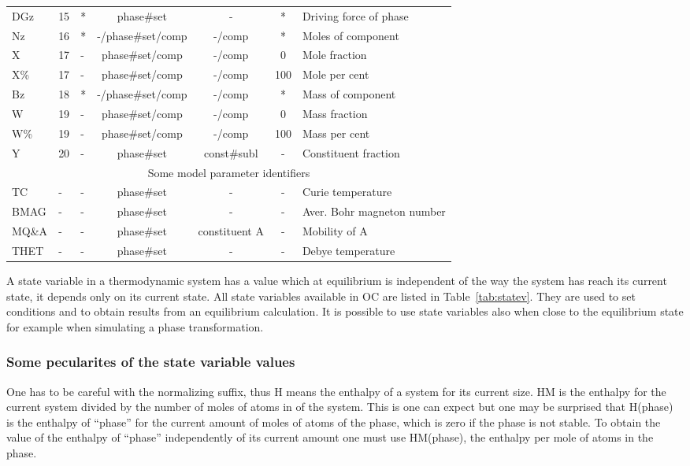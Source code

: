 \documentclass[11pt]{article}
\begin{document}
\begin{table}[!ht]
{\begin{tabular}{|lllcccl|}
DGz    & 15 & * & phase\#set & - & *  & Driving force of phase\\
Nz     & 16 & * & -/phase\#set/comp & -/comp & *  & Moles of component\\
X      & 17 & - & phase\#set/comp & -/comp & 0  & Mole fraction\\
X\%    & 17 & - & phase\#set/comp & -/comp & 100 & Mole per cent\\
Bz     & 18 & * & -/phase\#set/comp & -/comp & *  & Mass of component\\
W      & 19 & - & phase\#set/comp & -/comp & 0 & Mass fraction\\
W\%    & 19 & - & phase\#set/comp & -/comp & 100 & Mass per cent\\
Y      & 20 &- & phase\#set & const\#subl & -& Constituent fraction\\\hline
\multicolumn{7}{|c|}{Some model parameter identifiers}\\\hline
TC     & - &- &phase\#set & - & - & Curie temperature\\
BMAG   & - &- & phase\#set & - & - & Aver. Bohr magneton number\\
MQ\&A  & - &- & phase\#set & constituent A & - & Mobility of A\\
THET   & - &- & phase\#set & - & - & Debye temperature\\\hline
\end{tabular}
}
\end{table}

A state variable in a thermodynamic system has a value which at
equilibrium is independent of the way the system has reach its current
state, it depends only on its current state.  All state variables
available in OC are listed in Table~\ref{tab:statev}.  They are used
to set conditions and to obtain results from an equilibrium
calculation.  It is possible to use state variables also when close to
the equilibrium state for example when simulating a phase
transformation.

\subsubsection{Some pecularites of the state variable values}

One has to be careful with the normalizing suffix, thus H means the
enthalpy of a system for its current size.  HM is the enthalpy for the
current system divided by the number of moles of atoms in of the
system.  This is one can expect but one may be surprised that H(phase)
is the enthalpy of ``phase'' for the current amount of moles of atoms
of the phase, which is zero if the phase is not stable.  To obtain the
value of the enthalpy of ``phase'' independently of its current amount
one must use HM(phase), the enthalpy per mole of atoms in the phase.
\end{document}
